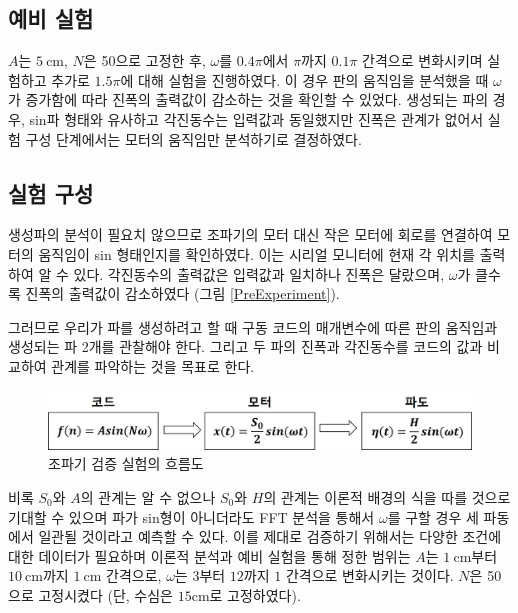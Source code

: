 \subsection{예비 실험}
$A$는 $5\mathrm{~cm}$, $N$은 50으로 고정한 후, $\omega$를 $0.4\pi$에서 $\pi$까지 $0.1\pi$ 간격으로 변화시키며 실험하고 추가로 $1.5\pi$에 대해 실험을 진행하였다. 
이 경우 판의 움직임을 분석했을 때 $\omega$가 증가함에 따라 진폭의 출력값이 감소하는 것을 확인할 수 있었다. 생성되는 파의 경우, sin파 형태와 유사하고 각진동수는 입력값과 동일했지만 진폭은 관계가 없어서 실험 구성 단계에서는 모터의 움직임만 분석하기로 결정하였다. 

\subsection{실험 구성}
생성파의 분석이 필요치 않으므로 조파기의 모터 대신 작은 모터에 회로를 연결하여 모터의 움직임이 sin 형태인지를 확인하였다. 이는 시리얼 모니터에 현재 각 위치를 출력하여 알 수 있다. 각진동수의 출력값은 입력값과 일치하나 진폭은 달랐으며, $\omega$가 클수록 진폭의 출력값이 감소하였다 (그림 \ref{PreExperiment}).


그러므로 우리가 파를 생성하려고 할 때 구동 코드의 매개변수에 따른 판의 움직임과 생성되는 파 2개를 관찰해야 한다. 그리고 두 파의 진폭과 각진동수를 코드의 값과 비교하여 관계를 파악하는 것을 목표로 한다.

\begin{figure}[H]
    \centering
    \includegraphics[width=12cm]{images/Flow_Chart(Analysis System_Kor).jpg}
    \caption{조파기 검증 실험의 흐름도}
    \label{Flow_Chart}
\end{figure}

비록 $S_0$와 $A$의 관계는 알 수 없으나 $S_0$와 $H$의 관계는 이론적 배경의 식을 따를 것으로 기대할 수 있으며 파가 sin형이 아니더라도 FFT 분석을 통해서 $\omega$를 구할 경우 세 파동에서 일관될 것이라고 예측할 수 있다.
이를 제대로 검증하기 위해서는 다양한 조건에 대한 데이터가 필요하며 이론적 분석과 예비 실험을 통해 정한 범위는 $A$는 $1\mathrm{~cm}$부터 $10\mathrm{~cm}$까지 $1\mathrm{~cm}$ 간격으로, $\omega$는 $3$부터 $12$까지 $1$ 간격으로 변화시키는 것이다. $N$은 50으로 고정시켰다 (단, 수심은 $15\mathrm{cm}$로 고정하였다).


